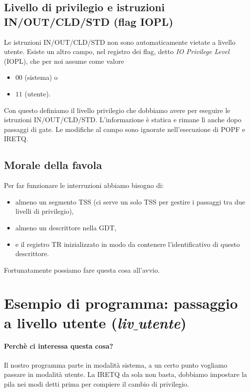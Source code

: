 \subsection{Livello di privilegio e istruzioni IN/OUT/CLD/STD (flag IOPL)}
Le istruzioni IN/OUT/CLD/STD non sono automaticamente vietate a livello utente. Esiste un altro campo, nel registro dei flag, detto \emph{IO Privilege Level} (IOPL), che per noi assume come valore 
\begin{multicols}{2}
	\begin{itemize}
		\item $00$ (sistema) o
		\item $11$ (utente).
	\end{itemize} 
\end{multicols} \noindent Con questo definiamo il livello privilegio che dobbiamo avere per eseguire le istruzioni IN/OUT/CLD/STD. L'informazione è statica e rimane lì anche dopo passaggi di gate. Le modifiche al campo sono ignorate nell'esecuzione di POPF e IRETQ. 

\subsection{Morale della favola}
\begin{framed}
	\noindent Per far funzionare le interruzioni abbiamo bisogno di:
	\begin{itemize}
		\item almeno un segmento TSS (ci serve un solo TSS per gestire i passaggi tra due livelli di privilegio),
		\item almeno un descrittore nella GDT,
		\item e il registro TR inizializzato in modo da contenere l'identificativo di questo descrittore. 
	\end{itemize}  Fortunatamente possiamo fare questa cosa all'avvio.
\end{framed}
\clearpage

\section{Esempio di programma: passaggio a livello utente (\emph{liv$\_$utente})}
\paragraph{Perchè ci interessa questa cosa?} Il nostro programma parte in modalità sistema, a un certo punto vogliamo passare in modalità utente. La IRETQ da sola non basta, dobbiamo impostare la pila nei modi detti prima per compiere il cambio di privilegio.
